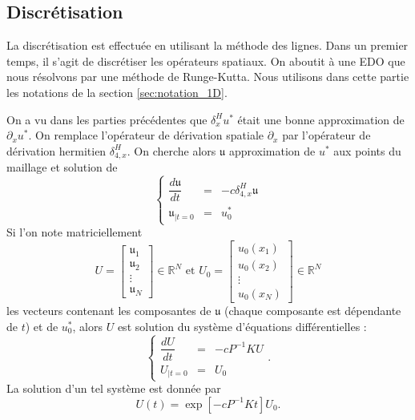 \subsection{Discrétisation}

La discrétisation est effectuée en utilisant la méthode des lignes. Dans un premier temps, il s'agit de discrétiser les opérateurs spatiaux. On aboutit à une EDO que nous résolvons par une méthode de Runge-Kutta. Nous utilisons dans cette partie les notations de la section \ref{sec:notation_1D}.
 
On a vu dans les parties précédentes que $\delta_x^H u^*$ était une bonne approximation de $\partial_x u^*$. On remplace l'opérateur de dérivation spatiale $\partial_x$ par l'opérateur de dérivation hermitien $\delta_{4,x}^H$.
On cherche alors $\mathfrak{u}$ approximation de $u^*$ aux points du maillage et solution de 
\begin{equation}
\left\lbrace
\begin{array}{rcl}
\dfrac{d \mathfrak{u}}{dt} & = & - c \delta_{4,x}^H \mathfrak{u} \\
\mathfrak{u}_{|t=0} & = & u_0^*
\end{array}
\right.
\end{equation}
Si l'on note matriciellement 
\begin{equation}
U = \begin{bmatrix}
\mathfrak{u}_1 \\
\mathfrak{u}_2 \\
\vdots \\
\mathfrak{u}_N
\end{bmatrix} \in \mathbb{R}^N \text{ et } U_0 = \begin{bmatrix}
u_0(x_1) \\
u_0(x_2) \\
\vdots \\
u_0(x_N)
\end{bmatrix} \in \mathbb{R}^N
\end{equation}
les vecteurs contenant les composantes de $\mathfrak{u}$ (chaque composante est dépendante de $t$) et de $u_0^*$, alors $U$ est solution du système d'équations différentielles :
\begin{equation}
\left\lbrace
\begin{array}{rcl}
\dfrac{d U}{dt} & = & - c P^{-1}K U \\
U_{|t=0} & = & U_0
\end{array}
\right. .
\end{equation}
La solution d'un tel système est donnée par 
\begin{equation}
U(t) = \exp\left[ - c P^{-1}K t\right] U_0.
\end{equation}

